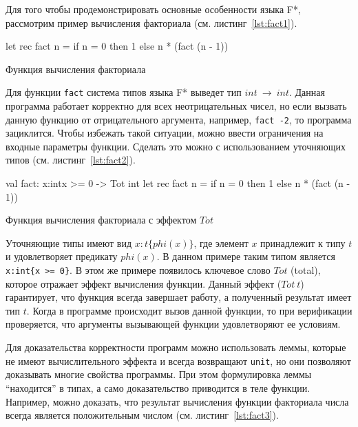 Для того чтобы продемонстрировать основные особенности языка F*, рассмотрим пример вычисления факториала (см. листинг~\ref{lst:fact1}). 

\begin{listing}
\begin{pyglist}[language=ocaml,numbers=none,numbersep=5pt, fontsize=\small]
let rec fact n =
    if n = 0 then 1 else n * (fact (n - 1))  
\end{pyglist}
\caption{Функция вычисления факториала}
\label{lst:fact1}  
\end{listing}

Для функции \verb|fact| система типов языка F* выведет тип $int ~\to~ int$. Данная программа работает корректно для всех неотрицательных чисел, но если вызвать данную функцию от отрицательного аргумента, например, \verb|fact -2|, то программа зациклится. Чтобы избежать такой ситуации, можно ввести ограничения на входные параметры функции. Сделать это можно с использованием уточняющих типов (см. листинг~\ref{lst:fact2}).

\begin{listing} 
\begin{pyglist}[language=ocaml,numbers=none,numbersep=5pt, fontsize=\small]
val fact: x:int{x >= 0} -> Tot int
let rec fact n =
    if n = 0 then 1 else n * (fact (n - 1))  
\end{pyglist}
\caption{Функция вычисления факториала с эффектом $Tot$}
\label{lst:fact2}   
\end{listing}

Уточняющие типы имеют вид $x:t\{phi(x)\}$, где элемент $x$ принадлежит к типу $t$ и удовлетворяет предикату $phi(x)$. В данном примере таким типом является \verb|x:int{x >= 0}|. В этом же примере появилось ключевое слово $Tot$ (total), которое отражает эффект вычисления функции. Данный эффект ($Tot~t$) гарантирует, что функция всегда завершает работу, а полученный результат имеет тип $t$. Когда в программе происходит вызов данной функции, то при верификации проверяется, что аргументы вызывающей функции удовлетворяют ее условиям.

Для доказательства корректности программ можно использовать леммы, которые не имеют вычислительного эффекта и всегда возвращают \verb|unit|, но они позволяют доказывать многие свойства программы. При этом формулировка леммы ``находится'' в типах, а само доказательство приводится в теле функции. Например, можно доказать, что результат вычисления функции факториала числа всегда является положительным числом (см. листинг~\ref{lst:fact3}).

